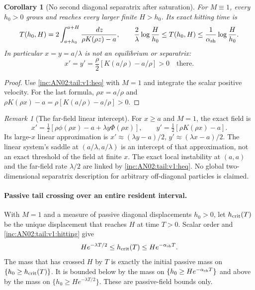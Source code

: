 \documentclass[11pt]{article}
\numberwithin{equation}{section}
\newtheorem{corollary}[theorem]{Corollary}
\theoremstyle{remark}\newtheorem{remark}[theorem]{Remark}
\newcommand{\dd}{\,d}
\newcommand{\1}{\mathbf 1}
\begin{document}
\begin{corollary}[No second diagonal separatrix after saturation]
\label{inc:AN02:tail:v1:noseparatrix}
For $M\equiv1$, every $h_0>0$ grows and reaches every larger finite
$H>h_0$. Its exact hitting time is
\begin{equation}\label{inc:AN02:tail:v1:hitting}
 T(h_0,H)=2\int_{a+h_0}^{a+H}
 \frac{\dd z}{\rho K(\rho z)-a},\qquad
 \frac2\lambda\log\frac H{h_0}
 \le T(h_0,H)\le\frac1{\alpha_{\rm sh}}\log\frac H{h_0}.
\end{equation}
In particular $x=y=a/\lambda$ is not an equilibrium or separatrix:
\begin{equation}\label{inc:AN02:tail:v1:intercept}
 x'=y'=\frac\rho2\left[K(a/\rho)-a/\rho\right]>0
 \quad\text{there}.
\end{equation}
\end{corollary}
\begin{proof}
Use \eqref{inc:AN02:tail:v1:heq} with $M=1$ and integrate the scalar
positive velocity. For the last formula, $\rho x=a/\rho$ and
$\rho K(\rho x)-a=\rho[K(a/\rho)-a/\rho]>0$.
\end{proof}

\begin{remark}[The far-field linear intercept]
For $x\ge a$ and $M=1$, the exact field is
\[
 x'=\tfrac12[\rho\phi(\rho x)-a+\lambda y\Phi(\rho x)],\qquad
 y'=\tfrac12[\rho K(\rho x)-a].
\]
Its large-$x$ linear approximation is
$x'\approx(\lambda y-a)/2$, $y'\approx(\lambda x-a)/2$.
The linear system's saddle at $(a/\lambda,a/\lambda)$ is an intercept of
that approximation, not an exact threshold of the field at finite $x$.
The exact local instability at $(a,a)$ and the far-field rate $\lambda/2$
are linked by \eqref{inc:AN02:tail:v1:heq}. No global two-dimensional
separatrix description for arbitrary off-diagonal particles is claimed.
\end{remark}

\paragraph{Passive tail crossing over an entire resident interval.}
With $M=1$ and a measure of passive diagonal displacements $h_0>0$,
let $h_{\rm crit}(T)$ be the unique displacement that reaches $H$ at time
$T>0$. Scalar order and \eqref{inc:AN02:tail:v1:hitting} give
\[
 He^{-\lambda T/2}\le h_{\rm crit}(T)\le He^{-\alpha_{\rm sh}T}.
\]
The mass that has crossed $H$ by $T$ is exactly the initial passive mass
on $\{h_0\ge h_{\rm crit}(T)\}$. It is bounded below by the mass on
$\{h_0\ge He^{-\alpha_{\rm sh}T}\}$ and above by the mass on
$\{h_0\ge He^{-\lambda T/2}\}$. These are passive-field bounds only.
\end{document}
